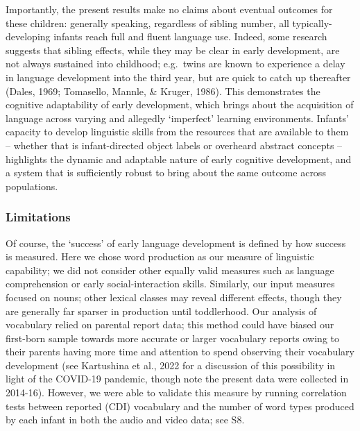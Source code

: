 \documentclass[
  man,mask,floatsintext]{apa6}
\begin{document}
Importantly, the present results make no claims about eventual outcomes for these children: generally speaking, regardless of sibling number, all typically-developing infants reach full and fluent language use. Indeed, some research suggests that sibling effects, while they may be clear in early development, are not always sustained into childhood; e.g.~twins are known to experience a delay in language development into the third year, but are quick to catch up thereafter (Dales, 1969; Tomasello, Mannle, \& Kruger, 1986). This demonstrates the cognitive adaptability of early development, which brings about the acquisition of language across varying and allegedly `imperfect' learning environments. Infants' capacity to develop linguistic skills from the resources that are available to them -- whether that is infant-directed object labels or overheard abstract concepts -- highlights the dynamic and adaptable nature of early cognitive development, and a system that is sufficiently robust to bring about the same outcome across populations.

\hypertarget{limitations}{%
\subsubsection{Limitations}\label{limitations}}

Of course, the `success' of early language development is defined by how success is measured. Here we chose word production as our measure of linguistic capability; we did not consider other equally valid measures such as language comprehension or early social-interaction skills. Similarly, our input measures focused on nouns; other lexical classes may reveal different effects, though they are generally far sparser in production until toddlerhood. Our analysis of vocabulary relied on parental report data; this method could have biased our first-born sample towards more accurate or larger vocabulary reports owing to their parents having more time and attention to spend observing their vocabulary development (see Kartushina et al., 2022 for a discussion of this possibility in light of the COVID-19 pandemic, though note the present data were collected in 2014-16). However, we were able to validate this measure by running correlation tests between reported (CDI) vocabulary and the number of word types produced by each infant in both the audio and video data; see S8.
\end{document}
